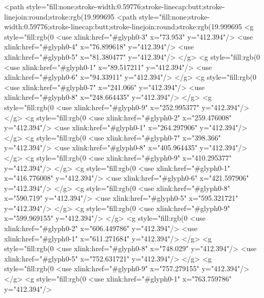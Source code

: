 <path style="fill:none;stroke-width:0.59776;stroke-linecap:butt;stroke-linejoin:round;stroke:rgb(19.999695%
<path style="fill:none;stroke-width:0.59776;stroke-linecap:butt;stroke-linejoin:round;stroke:rgb(19.999695%
<g style="fill:rgb(0%
  <use xlink:href="#glyph0-3" x="73.953" y="412.394"/>
  <use xlink:href="#glyph0-4" x="76.899618" y="412.394"/>
  <use xlink:href="#glyph0-5" x="81.380477" y="412.394"/>
</g>
<g style="fill:rgb(0%
  <use xlink:href="#glyph0-1" x="89.517211" y="412.394"/>
  <use xlink:href="#glyph0-6" x="94.33911" y="412.394"/>
</g>
<g style="fill:rgb(0%
  <use xlink:href="#glyph0-7" x="241.066" y="412.394"/>
  <use xlink:href="#glyph0-8" x="248.664435" y="412.394"/>
</g>
<g style="fill:rgb(0%
  <use xlink:href="#glyph0-9" x="252.995377" y="412.394"/>
</g>
<g style="fill:rgb(0%
  <use xlink:href="#glyph0-2" x="259.476008" y="412.394"/>
  <use xlink:href="#glyph0-1" x="264.297906" y="412.394"/>
</g>
<g style="fill:rgb(0%
  <use xlink:href="#glyph0-7" x="398.366" y="412.394"/>
  <use xlink:href="#glyph0-8" x="405.964435" y="412.394"/>
</g>
<g style="fill:rgb(0%
  <use xlink:href="#glyph0-9" x="410.295377" y="412.394"/>
</g>
<g style="fill:rgb(0%
  <use xlink:href="#glyph0-1" x="416.776008" y="412.394"/>
  <use xlink:href="#glyph0-6" x="421.597906" y="412.394"/>
</g>
<g style="fill:rgb(0%
  <use xlink:href="#glyph0-8" x="590.719" y="412.394"/>
  <use xlink:href="#glyph0-5" x="595.321721" y="412.394"/>
</g>
<g style="fill:rgb(0%
  <use xlink:href="#glyph0-9" x="599.969155" y="412.394"/>
</g>
<g style="fill:rgb(0%
  <use xlink:href="#glyph0-2" x="606.449786" y="412.394"/>
  <use xlink:href="#glyph0-1" x="611.271684" y="412.394"/>
</g>
<g style="fill:rgb(0%
  <use xlink:href="#glyph0-8" x="748.029" y="412.394"/>
  <use xlink:href="#glyph0-5" x="752.631721" y="412.394"/>
</g>
<g style="fill:rgb(0%
  <use xlink:href="#glyph0-9" x="757.279155" y="412.394"/>
</g>
<g style="fill:rgb(0%
  <use xlink:href="#glyph0-1" x="763.759786" y="412.394"/>
